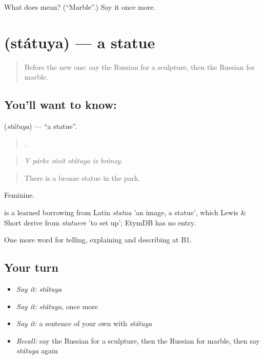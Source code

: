\begin{tcolorbox}[breakable,colback=teal!4,colframe=teal!35!black,title={Before you move on}]
What does  mean? (\textquotedblleft{}Marble\textquotedblright{}.) Say it once more.
\end{tcolorbox}
\section[\texorpdfstring{\ru{статуя} (státuya)}{статуя (státuya)}]{ (státuya) — a statue}

\label{lesson:RU-C522-statuya}



\begin{quote}
Before the new one: say the Russian for a sculpture, then the Russian for marble.
\end{quote}

\subsection*{You'll want to know: }
\textbf{} (\emph{státuya}) — \textquotedblleft{}a statue\textquotedblright{}.

\begin{quote}
     .
\end{quote}

\begin{quote}
\emph{V párke stoít státuya iz brónzy.}
\end{quote}

\begin{quote}
There is a bronze statue in the park.
\end{quote}

Feminine.

\begin{cousinweb}
\emph{} is a learned borrowing from Latin \emph{statua} 'an image, a statue', which Lewis \& Short derive from \emph{statuere} 'to set up'; EtymDB has no entry.
\end{cousinweb}

\begin{grammarlens}[title={What you've built}]
One more word for telling, explaining and describing at B1.
\end{grammarlens}

\subsection*{Your turn}
\begin{itemize}
\raggedright
  \item \emph{Say it:} \emph{státuya}
  \item \emph{Say it:} \emph{státuya}, once more
  \item \emph{Say it:} a sentence of your own with \emph{státuya}
  \item \emph{Recall:} say the Russian for a sculpture, then the Russian for marble, then say \emph{státuya} again
\end{itemize}

